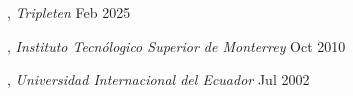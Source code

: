 
, \textit{Tripleten}	\hfill Feb 2025

, \textit{Instituto Tecnólogico Superior de Monterrey} \hfill	Oct 2010

, \textit{Universidad Internacional del Ecuador} \hfill	Jul 2002




